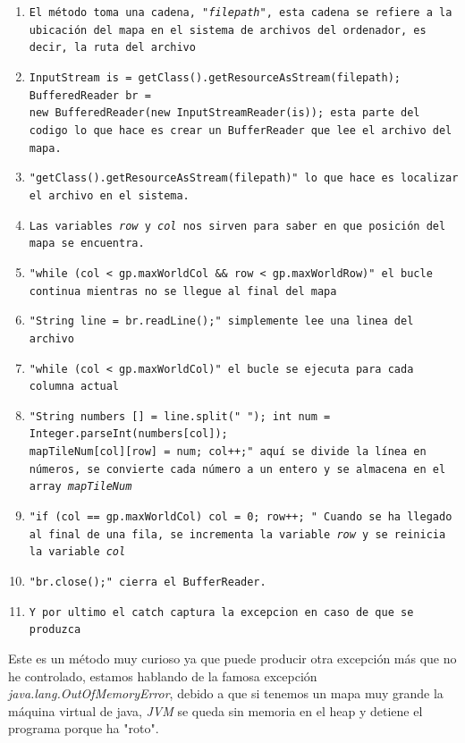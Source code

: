 \documentclass[a4paper]{article}
\begin{document}
\begin{enumerate}
    \item \texttt{El método toma una cadena, \textit{"filepath"}, esta cadena se refiere a la ubicación del mapa en el sistema de archivos del ordenador, es decir, la ruta del archivo}
    \item \texttt{InputStream is = getClass().getResourceAsStream(filepath); BufferedReader br = \\
              new BufferedReader(new InputStreamReader(is));
              esta parte del codigo lo que hace es crear un BufferReader que lee el archivo del mapa.}
    \item \texttt{"getClass().getResourceAsStream(filepath)" lo que hace es localizar el archivo en el sistema.}
    \item \texttt{Las variables \textit{row} y \textit{col} nos sirven para saber en que posición del mapa se encuentra.}
    \item \texttt{"while (col < gp.maxWorldCol \&\& row < gp.maxWorldRow)" el bucle continua mientras no se llegue al final del mapa}
    \item \texttt{"String line = br.readLine();" simplemente lee una linea del archivo}
    \item \texttt{"while (col < gp.maxWorldCol)" el bucle se ejecuta para cada columna actual}
    \item \texttt{"String numbers [] = line.split(" "); int num = Integer.parseInt(numbers[col]);\\ mapTileNum[col][row] = num; col++;" aquí se divide la línea en números, se convierte cada número a un entero y se almacena en el array \textit{mapTileNum}}
    \item \texttt{"if (col == gp.maxWorldCol){ col = 0; row++; }" Cuando se ha llegado al final de una fila, se incrementa la variable \textit{row} y se reinicia la variable \textit{col}}
    \item \texttt{"br.close();" cierra el BufferReader.}
    \item \texttt{Y por ultimo el catch captura la excepcion en caso de que se produzca}
\end{enumerate}
Este es un método muy curioso ya que puede producir otra excepción más que no he controlado, estamos hablando de la famosa excepción \textit{java.lang.OutOfMemoryError}, debido a que si tenemos un mapa muy grande
la máquina virtual de java, \textit{JVM} se queda sin memoria en el heap y detiene el programa porque ha "roto".
\clearpage
\end{document}
